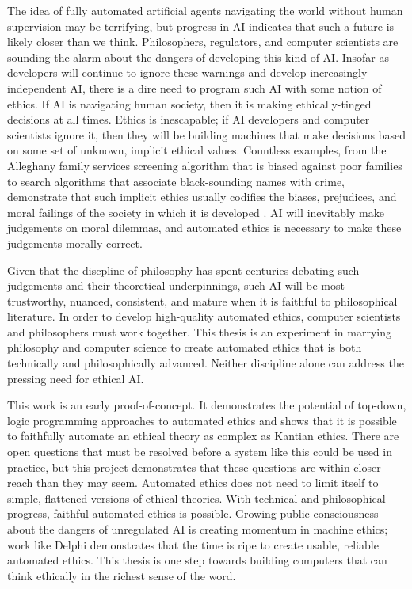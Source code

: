 \begin{isabellebody}
\begin{isamarkuptext}
The idea of fully automated artificial agents navigating the world without human supervision
may be terrifying, but progress in AI indicates that such a future is likely closer than we think. 
Philosophers, regulators, and computer scientists are sounding the alarm about the dangers of developing
this kind of AI. Insofar as developers will continue to ignore these warnings and develop increasingly 
independent AI, there is a dire need to program such AI with some notion of ethics. If AI is navigating
human society, then it is making ethically-tinged decisions at all times. Ethics is inescapable; 
if AI developers and computer scientists ignore it, then they will be building machines that make decisions
based on some set of unknown, implicit ethical values. Countless examples, from the Alleghany family services screening
algorithm that is biased against poor families to search algorithms that associate black-sounding names
with crime, demonstrate that such implicit ethics usually codifies the biases, prejudices, and moral
failings of the society in which it is developed \citep{eubanks, sweeney}. AI will inevitably make judgements on moral dilemmas, 
and automated ethics is necessary to make these judgements morally correct. 

Given that the discpline of philosophy has spent centuries debating such judgements and their theoretical 
underpinnings, such AI will be most trustworthy, nuanced, consistent, and mature when it is faithful to 
philosophical literature. In order to develop high-quality automated ethics, computer scientists and 
philosophers must work together. This thesis is an experiment in marrying philosophy and computer science 
to create automated ethics that is both technically and philosophically advanced. Neither discipline alone
can address the pressing need for ethical AI.

This work is an early proof-of-concept. It demonstrates the potential of top-down, logic programming 
approaches to automated ethics and shows that it is possible to faithfully automate an ethical theory as
complex as Kantian ethics. There are open questions that must be resolved before a system like this 
could be used in practice, but this project demonstrates that these questions are within closer reach
than they may seem. Automated ethics does not need to limit itself to simple, flattened versions of 
ethical theories. With technical and philosophical progress, faithful automated ethics is possible.
Growing public consciousness about the dangers of unregulated AI is creating momentum in machine ethics; 
work like Delphi demonstrates that the time is ripe to create usable, reliable automated ethics. This 
thesis is one step towards building computers that can think ethically in the richest sense of the word.%
\end{isamarkuptext}\isamarkuptrue%
%
\isadelimtheory
%
\endisadelimtheory
%
\isatagtheory
%
\endisatagtheory
{\isafoldtheory}%
%
\isadelimtheory
%
\endisadelimtheory
%
\end{isabellebody}%
